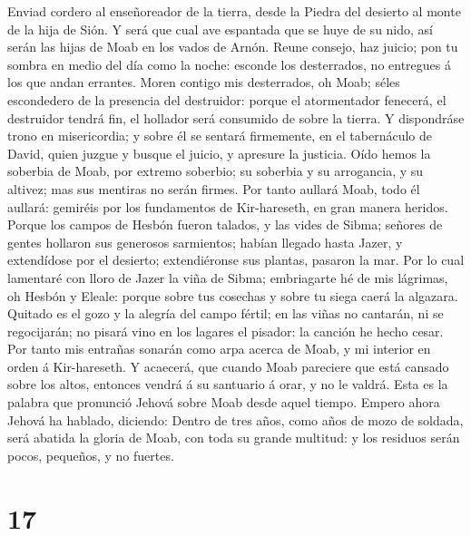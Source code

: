  Enviad cordero al enseñoreador de la tierra, desde la
Piedra del desierto al monte de la hija de Sión.  Y será
que cual ave espantada que se huye de su nido, así serán las hijas de
Moab en los vados de Arnón.  Reune consejo, haz juicio;
pon tu sombra en medio del día como la noche: esconde los desterrados,
no entregues á los que andan errantes.  Moren contigo mis
desterrados, oh Moab; séles escondedero de la presencia del destruidor:
porque el atormentador fenecerá, el destruidor tendrá fin, el hollador
será consumido de sobre la tierra.  Y dispondráse trono en
misericordia; y sobre él se sentará firmemente, en el tabernáculo de
David, quien juzgue y busque el juicio, y apresure la justicia.
 Oído hemos la soberbia de Moab, por extremo soberbio; su
soberbia y su arrogancia, y su altivez; mas sus mentiras no serán
firmes.  Por tanto aullará Moab, todo él aullará: gemiréis
por los fundamentos de Kir-hareseth, en gran manera heridos.
 Porque los campos de Hesbón fueron talados, y las vides
de Sibma; señores de gentes hollaron sus generosos sarmientos; habían
llegado hasta Jazer, y extendídose por el desierto; extendiéronse sus
plantas, pasaron la mar.  Por lo cual lamentaré con lloro
de Jazer la viña de Sibma; embriagarte hé de mis lágrimas, oh Hesbón y
Eleale: porque sobre tus cosechas y sobre tu siega caerá la algazara.
 Quitado es el gozo y la alegría del campo fértil; en las
viñas no cantarán, ni se regocijarán; no pisará vino en los lagares el
pisador: la canción he hecho cesar.  Por tanto mis
entrañas sonarán como arpa acerca de Moab, y mi interior en orden á
Kir-hareseth.  Y acaecerá, que cuando Moab pareciere que
está cansado sobre los altos, entonces vendrá á su santuario á orar, y
no le valdrá.  Esta es la palabra que pronunció Jehová
sobre Moab desde aquel tiempo.  Empero ahora Jehová ha
hablado, diciendo: Dentro de tres años, como años de mozo de soldada,
será abatida la gloria de Moab, con toda su grande multitud: y los
residuos serán pocos, pequeños, y no fuertes.

\hypertarget{section-16}{%
\section{17}\label{section-16}}

